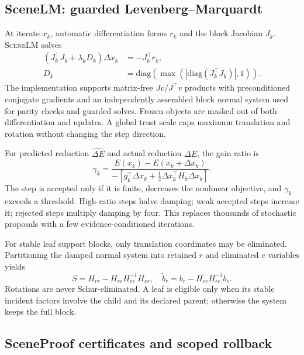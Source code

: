 \documentclass[10pt,twocolumn]{article}
\newcommand{\method}{\textsc{SceneLM}}
\begin{document}
\subsection{SceneLM: guarded Levenberg--Marquardt}

At iterate $x_k$, automatic differentiation forms $r_k$ and the block
Jacobian $J_k$.  \method{} solves
\begin{equation}
\begin{aligned}
 (J_k^\top J_k+\lambda_k D_k)\Delta x_k&=-J_k^\top r_k,\\
 D_k&=\mathrm{diag}\!\left(\max(|\mathrm{diag}(J_k^\top J_k)|,1)\right).
\end{aligned}
 \label{eq:lm}
\end{equation}
The implementation supports matrix-free $Jv/J^\top v$ products with
preconditioned conjugate gradients and an independently assembled block normal
system used for parity checks and guarded solves.  Frozen objects are masked
out of both differentiation and updates.  A global trust scale caps maximum
translation and rotation without changing the step direction.

For predicted reduction $\widehat{\Delta E}$ and actual reduction $\Delta E$,
the gain ratio is
\begin{equation}
  \gamma_k=\frac{E(x_k)-E(x_k+\Delta x_k)}
  {-[g_k^\top\Delta x_k+\tfrac12\Delta x_k^\top H_k\Delta x_k]}.
\end{equation}
The step is accepted only if it is finite, decreases the nonlinear objective,
and $\gamma_k$ exceeds a threshold.  High-ratio steps halve damping; weak
accepted steps increase it; rejected steps multiply damping by four.  This
replaces thousands of stochastic proposals with a few evidence-conditioned
iterations.

For stable leaf support blocks, only translation coordinates may be
eliminated.  Partitioning the damped normal system into retained $r$ and
eliminated $e$ variables yields
\begin{equation}
  S=H_{rr}-H_{re}H_{ee}^{-1}H_{er},\quad
  \tilde b_r=b_r-H_{re}H_{ee}^{-1}b_e.
  \label{eq:schur}
\end{equation}
Rotations are never Schur-eliminated.  A leaf is eligible only when its stable
incident factors involve the child and its declared parent; otherwise the
system keeps the full block.

\subsection{SceneProof certificates and scoped rollback}
\end{document}
